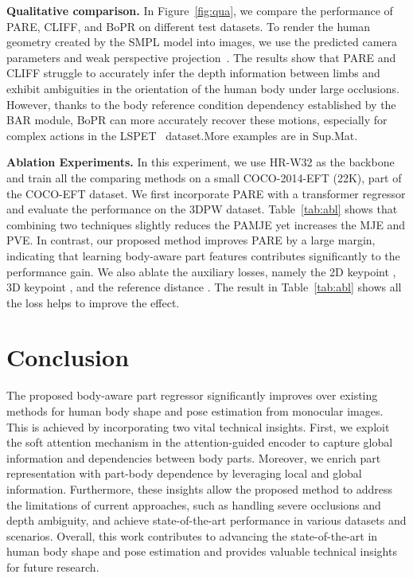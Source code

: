 \documentclass[10pt,twocolumn,letterpaper]{article}
\begin{document}
\noindent\textbf{Qualitative comparison.}
In Figure~\ref{fig:qua}, we compare the performance of PARE, CLIFF, and BoPR on different test datasets. To render the human geometry created by the SMPL model into images, we use the predicted camera parameters and weak perspective projection~\cite{kissos2020beyond}. The results show that PARE and CLIFF struggle to accurately infer the depth information between limbs and exhibit ambiguities in the orientation of the human body under large occlusions. However, thanks to the body reference condition dependency established by the BAR module, BoPR can more accurately recover these motions, especially for complex actions in the LSPET~\cite{johnson2011learning} dataset.More examples are in Sup.Mat.






\noindent\textbf{Ablation Experiments.}
In this experiment, we use HR-W32 as the backbone and train all the comparing methods on a small COCO-2014-EFT (22K), part of the COCO-EFT dataset.  We first incorporate PARE with a transformer regressor and evaluate the performance on the 3DPW dataset. Table~\ref{tab:abl} shows that combining two techniques slightly reduces the PAMJE yet  increases the MJE and PVE.  In contrast, our proposed method improves PARE by a large margin, indicating that learning body-aware part features contributes significantly to the performance gain. We also ablate the auxiliary losses, namely the 2D keypoint , 3D keypoint , and the reference distance . The result in Table~\ref{tab:abl} shows all the loss helps to improve the effect.






\section{Conclusion}
The proposed body-aware part regressor significantly improves over existing methods for human body shape and pose estimation from monocular images. This is achieved by incorporating two vital technical insights. First, we exploit the soft attention mechanism in the attention-guided encoder to capture global information and dependencies between body parts. Moreover, we enrich part representation with part-body dependence by leveraging local and global information. Furthermore, these insights allow the proposed method to address the limitations of current approaches, such as handling severe occlusions and depth ambiguity, and achieve state-of-the-art performance in various datasets and scenarios. Overall, this work contributes to advancing the state-of-the-art in human body shape and pose estimation and provides valuable technical insights for future research.
{\small


}
\end{document}
